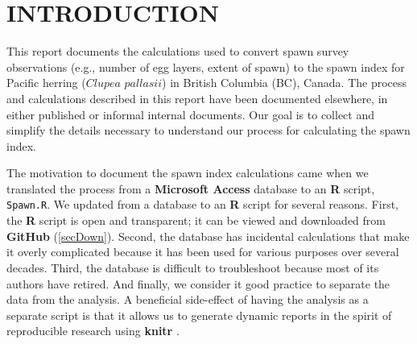 \documentclass[12pt]{article}
\begin{document}
\renewcommand\listfigurename{LIST OF FIGURES}
\renewcommand\listtablename{LIST OF TABLES}

\renewcommand*{\thefootnote}{\fnsymbol{footnote}}


\tableofcontents \clearpage  %
\listoffigures \listoftables \clearpage  %

\thispagestyle{empty}  %
\renewcommand*{\thefootnote}{\arabic{footnote}}  %
\setcounter{footnote}{0}  %


\section{INTRODUCTION}

This report documents the calculations used to convert spawn survey observations (e.g., number of egg layers, extent of spawn) to the spawn index for Pacific herring ($Clupea$ $pallasii$) in British Columbia (BC), Canada.
The process and calculations described in this report have been documented elsewhere, in either published or informal internal documents.
Our goal is to collect and simplify the details necessary to understand our process for calculating the spawn index.

The motivation to document the spawn index calculations came when we translated the process from a \textbf{Microsoft Access} database to an \textbf{R} \citeyearpar[RCT][]{R-3.3.2} script, \texttt{Spawn.R}.
We updated from a database to an \textbf{R} script for several reasons.
First, the \textbf{R} script is open and transparent; it can be viewed and downloaded from \textbf{GitHub} (\autoref{secDown}).
Second, the database has incidental calculations that make it overly complicated because it has been used for various purposes over several decades.
Third, the database is difficult to troubleshoot because most of its authors have retired.
And finally, we consider it good practice to separate the data from the analysis.
A beneficial side-effect of having the analysis as a separate script is that it allows us to generate dynamic reports in the spirit of reproducible research using \textbf{knitr} \citep{Xie2015}.
\end{document}
